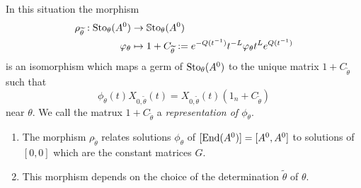 \begin{prop} \label{prop:representation}
  In this situation the morphism
  \begin{align*}
    \rho_{\widetilde\theta}:\operatorname{Sto}_\theta(A^0)&\to\operatorname{\mathbb{S}to}_\theta(A^0)
    \\\varphi_\theta
    &\mapsto 1+C_{\widetilde\theta}
    :=e^{-Q(t^{-1})}t^{-L} \varphi_\theta t^L e^{Q(t^{-1})}
  \end{align*}
  is an isomorphism which maps a germ of $\operatorname{Sto}_\theta(A^0)$ to the unique
  matrix $1+C_{\tilde\theta}$ such that
  \begin{equation} \label{eq:representation}
    \phi_\theta(t)X_{0,\tilde\theta}(t)
    =X_{0,\tilde\theta}(t)(1_n+C_{\tilde\theta})
  \end{equation}
  near $\theta$.  We call the matrux $1+C_{\tilde\theta}$ a
  \emph{representation of $\phi_\theta$}.
  \begin{s-rem}
    \begin{enumerate}
      \item {}
        The morphism $\rho_{\tilde\theta}$ relates solutions $\phi_\theta$ of
        $[\operatorname{End}(A^0)]=[A^0,A^0]$ to solutions of $[0,0]$ which are the constant
        matrices $G$.
      \item This morphism depends on the choice of the determination
        $\tilde\theta$ of $\theta$.
    \end{enumerate}
  \end{s-rem}
\end{prop}
